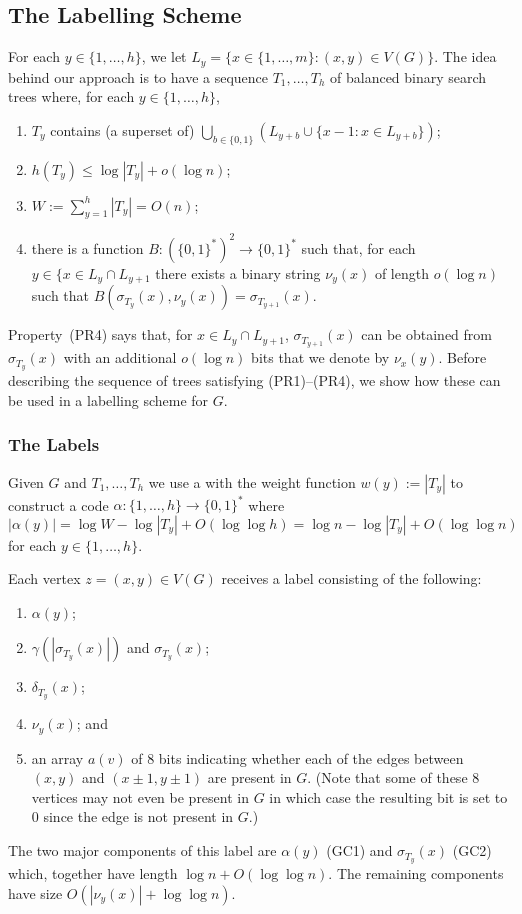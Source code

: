 \documentclass[kpfonts]{patmorin}
\begin{document}
\subsection{The Labelling Scheme}

For each $y\in\{1,\ldots,h\}$, we let $L_y=\{x\in\{1,\ldots,m\}:(x,y)\in V(G)\}$.  The idea behind our approach is to have a sequence $T_1,\ldots,T_h$ of balanced binary search trees where, for each $y\in\{1,\ldots,h\}$,
\begin{enumerate}[(PR1)]
  \item $T_y$ contains (a superset of) $\bigcup_{b\in\{0,1\}} (L_{y+b}\cup \{x-1:x\in L_{y+b}\})$;
  
  \item $h(T_y)\le\log |T_y| + o(\log n)$;
  
  \item $W:=\sum_{y=1}^h |T_y| = O(n)$;
  
  \item there is a function $B:(\{0,1\}^*)^2\to\{0,1\}^*$ such that, for each $y\in\{x\in L_y\cap L_{y+1}$ there exists a binary string $\nu_y(x)$ of length $o(\log n)$ such that $B(\sigma_{T_{y}}(x), \nu_y(x))=\sigma_{T_{y+1}}(x)$.
\end{enumerate}

Property~(PR4) says that, for $x\in L_y\cap L_{y+1}$, $\sigma_{T_{y+1}}(x)$ can be obtained from $\sigma_{T_{y}}(x)$ with an additional $o(\log n)$ bits that we denote by $\nu_x(y)$.  Before describing the sequence of trees satisfying (PR1)--(PR4), we show how these can be used in a labelling scheme for $G$. 


\subsubsection{The Labels}

Given $G$ and $T_{1},\ldots,T_h$ we use a  with the weight function $w(y):=|T_y|$ to construct a code $\alpha:\{1,\ldots,h\}\to\{0,1\}^*$ where
\[  
  |\alpha(y)| = \log W-\log|T_y| + O(\log\log h) = \log n - \log|T_y| + O(\log\log n)
\]
for each $y\in\{1,\ldots,h\}$.  

Each vertex $z=(x,y)\in V(G)$ receives a label consisting of the following:  
\begin{enumerate}[(GC1)]
  \item $\alpha(y)$;
  \item $\gamma(|\sigma_{T_y}(x)|)$ and $\sigma_{T_y}(x)$;    
  \item $\delta_{T_y}(x)$;
  \item $\nu_y(x)$; and
  \item an array $a(v)$ of $8$ bits indicating whether each of the edges between $(x,y)$ and $(x\pm 1,y\pm 1)$ are present in $G$.  (Note that some of these 8 vertices may not even be present in $G$ in which case the resulting bit is set to 0 since the edge is not present in $G$.)
\end{enumerate}
The two major components of this label are $\alpha(y)$ (GC1) and $\sigma_{T_y}(x)$ (GC2) which, together have length $\log n + O(\log\log n)$.  The remaining components have size $O(|\nu_y(x)|+\log\log n)$.  
\end{document}
